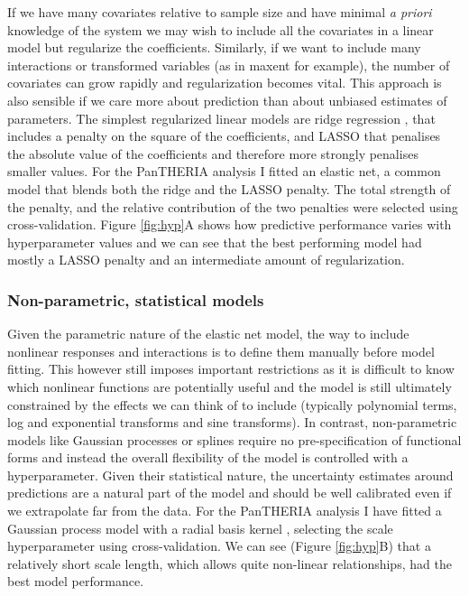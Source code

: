 \documentclass[12pt]{article}
\begin{document}
If we have many covariates relative to sample size and have minimal \emph{a priori} knowledge of the system we may wish to include all the covariates in a linear model but regularize the coefficients.
Similarly, if we want to include many interactions or transformed variables (as in maxent \citep{maxent} for example), the number of covariates can grow rapidly and regularization becomes vital.
This approach is also sensible if we care more about prediction than about unbiased estimates of parameters.
The simplest regularized linear models are ridge regression \citep{ridge}, that includes a penalty on the square of the coefficients, and LASSO \citep{tibshirani1996regression} that penalises the absolute value of the coefficients and therefore more strongly penalises smaller values.
For the PanTHERIA analysis I fitted an elastic net, a common model that blends both the ridge and the LASSO penalty.
The total strength of the penalty, and the relative contribution of the two penalties were selected using cross-validation.
Figure \ref{fig:hyp}A shows how predictive performance varies with hyperparameter values and we can see that the best performing model had mostly a LASSO penalty and an intermediate amount of regularization.


\subsubsection{Non-parametric, statistical models}\label{non-parametric-statistical-models}

Given the parametric nature of the elastic net model, the way to include nonlinear responses and interactions is to define them manually before model fitting.
This however still imposes important restrictions as it is difficult to know which nonlinear functions are potentially useful and the model is still ultimately constrained by the effects we can think of to include (typically polynomial terms, log and exponential transforms and sine transforms).
In contrast, non-parametric models like Gaussian processes \citep{rasmussen2004gaussian} or splines \citep{splines} require no pre-specification of functional forms and instead the overall flexibility of the model is controlled with a hyperparameter.
Given their statistical nature, the uncertainty estimates around predictions are a natural part of the model and should be well calibrated even if we extrapolate far from the data.
For the PanTHERIA analysis I have fitted a Gaussian process model with a radial basis kernel \citep{kernlab}, selecting the scale hyperparameter using cross-validation.
We can see (Figure \ref{fig:hyp}B) that a relatively short scale length, which allows quite non-linear relationships, had the best model performance.
\end{document}
